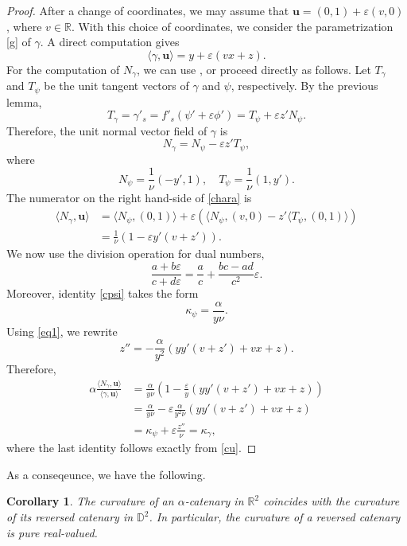 \documentclass[a4paper,12pt]{amsart}
\newtheorem{corollary}[theorem]{Corollary}
\theoremstyle{definition}
\def\r{\mathbb R}
\def\d{\mathsf d}
\def\d{\mathbb D}
\begin{document}
\begin{proof}
After a change of coordinates, we may assume that $\mathbf{u}=(0,1)+\varepsilon(v,0)$, where $v\in \r$. With this choice of coordinates, we consider the parametrization  \eqref{g} of $\gamma$. A direct computation gives
$$\langle \gamma,\mathbf u\rangle = y +\varepsilon(vx+z).$$
For the computation of $N_\gamma$, we can use \cite[Proposition 2.8]{lo}, or proceed directly as follows. Let $T_\gamma$ and $T_\psi$ be the unit tangent vectors of $\gamma$ and $\psi$, respectively. By the previous lemma, 
$$T_\gamma=\gamma'_s=f'_s(\psi'+\varepsilon\phi')=T_\psi+\varepsilon z' N_\psi.$$
Therefore, the unit normal vector field of $\gamma$ is
$$N_\gamma=  N_\psi - \varepsilon z' T_\psi,$$
where
$$N_\psi= \frac{1}{\nu}(-y', 1),\quad T_\psi=\frac{1}{\nu}(1,y').  $$
The numerator on the right hand-side of \eqref{chara} is 
\begin{equation*}
\begin{split}
\langle N_\gamma,\mathbf{u}\rangle&=\langle N_\psi,(0,1)\rangle+\varepsilon\left(\langle N_\psi,(v,0)-z'\langle T_\psi,(0,1)\rangle\right)\\
&= \frac{1}{\nu}\left(1 - \varepsilon y'(v+z')\right).
\end{split}
\end{equation*}
 We now use the division operation for dual numbers,
 $$\frac{a+b\varepsilon}{c+d\varepsilon}=\frac{a}{c}+\frac{bc-ad}{c^2}\varepsilon.$$
Moreover, identity \eqref{cpsi} takes the form
 $$\kappa_\psi=\frac{\alpha}{y\nu}.$$
Using \eqref{eq1}, we rewrite
$$z''=-\frac{\alpha}{y^2}(yy'(v+z')+ vx+z).$$
Therefore,
\begin{equation*}
\begin{split}
 \alpha\frac{\langle N_\gamma,\mathbf u\rangle}{\langle \gamma,\mathbf u\rangle} &=\frac{\alpha}{y\nu}\left(
 1-\frac{\varepsilon}{y}(yy'(v+z')+vx+z)\right)\\
 &=\frac{\alpha}{y\nu}-\varepsilon\frac{\alpha}{y^2\nu}(yy'(v+z')+vx+z)\\
 &=\kappa_\psi+\varepsilon\frac{z''}{\nu}=\kappa_\gamma,
 \end{split}
 \end{equation*}
 where the last identity follows exactly from \eqref{cu}. 
\end{proof}
 
As a conseqeunce, we have the following.

\begin{corollary}
The curvature of an $\alpha$-catenary in $\r^2$ coincides with the curvature of its reversed catenary in $\d^2$. In particular, the curvature of a reversed catenary is pure real-valued. 
\end{corollary}
\end{document}
